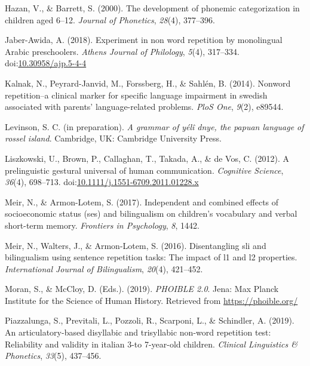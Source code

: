 \documentclass[english,,man,floatsintext]{apa6}
\begin{document}
\hypertarget{ref-hazan2000development}{}
Hazan, V., \& Barrett, S. (2000). The development of phonemic
categorization in children aged 6--12. \emph{Journal of Phonetics},
\emph{28}(4), 377--396.

\hypertarget{ref-jabere2018xperiment}{}
Jaber-Awida, A. (2018). Experiment in non word repetition by monolingual
Arabic preschoolers. \emph{Athens Journal of Philology}, \emph{5}(4),
317--334.
doi:\href{https://doi.org/10.30958/ajp.5-4-4}{10.30958/ajp.5-4-4}

\hypertarget{ref-kalnak2014nonword}{}
Kalnak, N., Peyrard-Janvid, M., Forssberg, H., \& Sahlén, B. (2014).
Nonword repetition--a clinical marker for specific language impairment
in swedish associated with parents' language-related problems.
\emph{PloS One}, \emph{9}(2), e89544.

\hypertarget{ref-levinsoninprepydgrammar}{}
Levinson, S. C. (in preparation). \emph{A grammar of yélî dnye, the
papuan language of rossel island}. Cambridge, UK: Cambridge University
Press.

\hypertarget{ref-liszkowski2012prelinguistic}{}
Liszkowski, U., Brown, P., Callaghan, T., Takada, A., \& de Vos, C.
(2012). A prelinguistic gestural universal of human communication.
\emph{Cognitive Science}, \emph{36}(4), 698--713.
doi:\href{https://doi.org/10.1111/j.1551-6709.2011.01228.x}{10.1111/j.1551-6709.2011.01228.x}

\hypertarget{ref-meir2017independent}{}
Meir, N., \& Armon-Lotem, S. (2017). Independent and combined effects of
socioeconomic status (ses) and bilingualism on children's vocabulary and
verbal short-term memory. \emph{Frontiers in Psychology}, \emph{8},
1442.

\hypertarget{ref-meir2016disentangling}{}
Meir, N., Walters, J., \& Armon-Lotem, S. (2016). Disentangling sli and
bilingualism using sentence repetition tasks: The impact of l1 and l2
properties. \emph{International Journal of Bilingualism}, \emph{20}(4),
421--452.

\hypertarget{ref-phoible}{}
Moran, S., \& McCloy, D. (Eds.). (2019). \emph{PHOIBLE 2.0}. Jena: Max
Planck Institute for the Science of Human History. Retrieved from
\url{https://phoible.org/}

\hypertarget{ref-piazzalunga2019articulatory}{}
Piazzalunga, S., Previtali, L., Pozzoli, R., Scarponi, L., \& Schindler,
A. (2019). An articulatory-based disyllabic and trisyllabic non-word
repetition test: Reliability and validity in italian 3-to 7-year-old
children. \emph{Clinical Linguistics \& Phonetics}, \emph{33}(5),
437--456.
\end{document}
